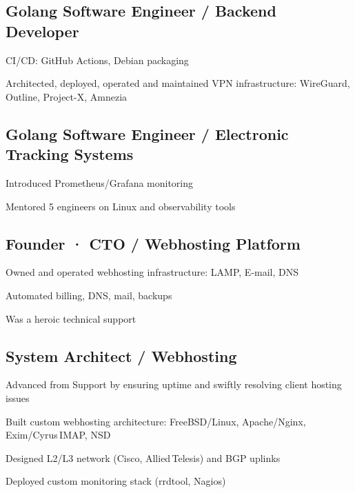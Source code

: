 \documentclass[letter,10pt]{article}
\begin{document}
\subsection{Golang Software Engineer / Backend Developer}
\begin{zitemize}
        \item CI/CD: GitHub Actions, Debian packaging
        \item Architected, deployed, operated and maintained VPN infrastructure: WireGuard, Outline, Project-X, Amnezia
\end{zitemize}

\subsection{{Golang Software Engineer / Electronic Tracking Systems}}
\begin{zitemize}
        \item Introduced Prometheus/Grafana monitoring 
        \item Mentored 5 engineers on Linux and observability tools
\end{zitemize}


\subsection{{Founder · CTO / Webhosting Platform}}
\begin{zitemize}
        \item Owned and operated webhosting infrastructure: LAMP, E-mail, DNS
        \item Automated billing, DNS, mail, backups
        \item Was a heroic technical support
\end{zitemize}

\subsection{{System Architect / Webhosting}}
\begin{zitemize}
        \item Advanced from Support by ensuring uptime and swiftly resolving client hosting issues
        \item Built custom webhosting architecture: FreeBSD/Linux, Apache/Nginx, Exim/Cyrus IMAP, NSD
        \item Designed L2/L3 network (Cisco, Allied Telesis) and BGP uplinks
        \item Deployed custom monitoring stack (rrdtool, Nagios)
\end{zitemize}
\end{document}
